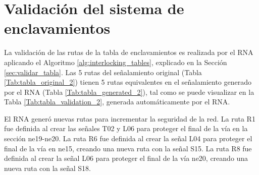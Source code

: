 \section{Validación del sistema de enclavamientos}

	La validación de las rutas de la tabla de enclavamientos es realizada por el RNA aplicando el Algoritmo \ref{alg:interlocking_tables}, explicado en la Sección \ref{sec:validar_tabla}. Las 5 rutas del señalamiento original (Tabla \ref{Tab:tabla_original_2}) tienen 5 rutas equivalentes en el señalamiento generado por el RNA (Tabla \ref{Tab:tabla_generated_2}), tal como se puede visualizar en la Tabla \ref{Tab:tabla_validation_2}, generada automáticamente por el RNA.

    \begin{table}[H]
        {
        \caption{Equivalencias entre las rutas originales y las generadas por el RNA.}
        \label{Tab:tabla_validation_2}
        \centering
            \begin{center}
            \end{center}
        }    
    \end{table}
        
    El RNA generó nuevas rutas para incrementar la seguridad de la red. La ruta R1 fue definida al crear las señales T02 y L06 para proteger el final de la vía en la sección ne19-ne20. La ruta R6 fue definida al crear la señal L04 para proteger el final de la vía en ne15, creando una nueva ruta con la señal S15. La ruta R8 fue definida al crear la señal L06 para proteger el final de la vía ne20, creando una nueva ruta con la señal S18.
    
